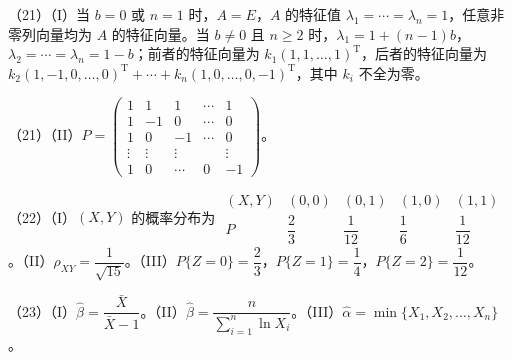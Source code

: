 \documentclass[UTF8,12pt]{ctexart}
\begin{document}
（21）（I）当 \(\displaystyle b=0\) 或 \(\displaystyle n=1\) 时，\(\displaystyle A=E\)，\(\displaystyle A\) 的特征值 \(\displaystyle \lambda_1=\cdots=\lambda_n=1\)，任意非零列向量均为 \(\displaystyle A\) 的特征向量。当 \(\displaystyle b\ne0\) 且 \(\displaystyle n\ge2\) 时，\(\displaystyle \lambda_1=1+(n-1)b\)，\(\displaystyle \lambda_2=\cdots=\lambda_n=1-b\)；前者的特征向量为 \(\displaystyle k_1(1,\allowbreak 1,\allowbreak \ldots,\allowbreak 1)^{\mathrm T}\)，后者的特征向量为 \(\displaystyle k_2(1,\allowbreak -1,\allowbreak 0,\allowbreak \ldots,\allowbreak 0)^{\mathrm T}+\cdots+k_n(1,\allowbreak 0,\allowbreak \ldots,\allowbreak 0,\allowbreak -1)^{\mathrm T}\)，其中 \(\displaystyle k_i\) 不全为零。


（21）（II）\(\displaystyle P=\begin{pmatrix}1&1&1&\cdots&1\\1&-1&0&\cdots&0\\1&0&-1&\cdots&0\\\vdots&\vdots&\vdots&&\vdots\\1&0&\cdots&0&-1\end{pmatrix}\)。


（22）（I）\(\displaystyle (X,\allowbreak Y)\) 的概率分布为 \(\displaystyle \begin{array}{c|cccc}(X,\allowbreak Y)&(0,\allowbreak 0)&(0,\allowbreak 1)&(1,\allowbreak 0)&(1,\allowbreak 1)\\\hline P&\dfrac{\displaystyle 2}{\displaystyle 3}&\dfrac{\displaystyle 1}{\displaystyle 12}&\dfrac{\displaystyle 1}{\displaystyle 6}&\dfrac{\displaystyle 1}{\displaystyle 12}\end{array}\)。（II）\(\displaystyle \rho_{XY}=\dfrac{\displaystyle 1}{\displaystyle \sqrt{15}}\)。（III）\(\displaystyle P\{Z=0\}=\dfrac{\displaystyle 2}{\displaystyle 3}\)，\(\displaystyle P\{Z=1\}=\dfrac{\displaystyle 1}{\displaystyle 4}\)，\(\displaystyle P\{Z=2\}=\dfrac{\displaystyle 1}{\displaystyle 12}\)。


（23）（I）\(\displaystyle \hat\beta=\dfrac{\displaystyle \bar X}{\displaystyle \bar X-1}\)。（II）\(\displaystyle \hat\beta=\dfrac{\displaystyle n}{\displaystyle \sum_{i=1}^n\ln X_i}\)。（III）\(\displaystyle \hat\alpha=\displaystyle \min\{X_1,\allowbreak X_2,\allowbreak \ldots,\allowbreak X_n\}\)。
\end{document}
